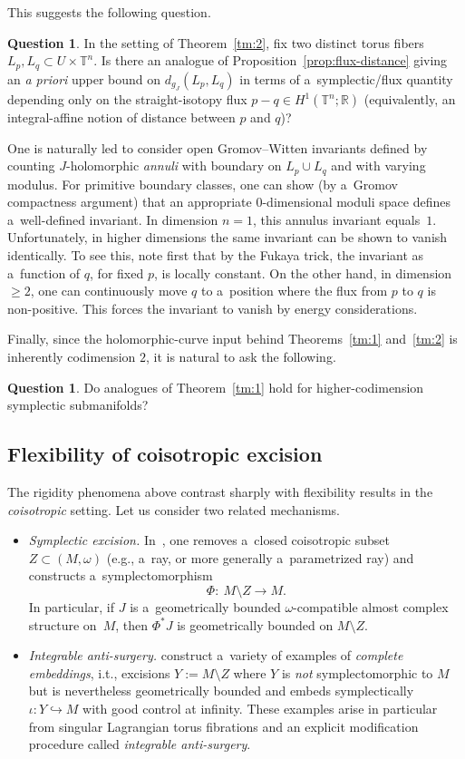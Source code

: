\documentclass[pdftex]{sigma}
\numberwithin{equation}{section}
\newcommand{\bR}{{\mathbb R}}
\newcommand{\bT}{{\mathbb T}}
\theoremstyle{definition}
\newtheorem{ques}[Theorem]{Question}
\begin{document}
This suggests the following question.
\begin{ques}
In the setting of Theorem~\ref{tm:2}, fix two distinct torus fibers $L_p,L_q\subset U\times\bT^n$.
Is there an analogue of Proposition~\ref{prop:flux-distance} giving an \emph{a priori} upper bound on $d_{g_J}(L_p,L_q)$ in terms of a~symplectic/flux quantity depending only on the straight-isotopy flux $p-q\in H^1(\bT^n;\bR)$ (equivalently, an integral-affine notion of distance between $p$ and $q$)?
\end{ques}
One is naturally led to consider open Gromov--Witten invariants defined by counting $J$-holomorphic \emph{annuli} with boundary on $L_p\cup L_q$ and with varying modulus.
For primitive boundary classes, one can show (by a~Gromov compactness argument) that an appropriate $0$-dimensional moduli space defines a~well-defined invariant.
In dimension $n=1$, this annulus invariant equals~$1$.
Unfortunately, in higher dimensions the same invariant can be shown to vanish identically. To see this, note first that by the Fukaya trick, the invariant as a~function of $q$, for fixed $p$, is locally constant. On the other hand, in dimension $\ge 2$, one can continuously move $q$ to a~position where the flux from $p$ to $q$ is non-positive. This forces the invariant to vanish by energy considerations.


Finally, since the holomorphic-curve input behind Theorems~\ref{tm:1} and~\ref{tm:2} is inherently codimension $2$, it is natural to ask the following.
\begin{ques}
Do analogues of Theorem~\ref{tm:1} hold for higher-codimension symplectic submani\-folds?
\end{ques}


\subsection{Flexibility of coisotropic excision}\label{sec:flexibility}
The rigidity phenomena above contrast sharply with flexibility results in the \emph{coisotropic} setting. Let us consider two related mechanisms.
\begin{itemize}
\itemsep=0pt
\item \emph{Symplectic excision.}
In~\cite{KarshonTangExcision,StratmannParamRays}, one removes a~closed coisotropic subset $Z\subset (M,\omega)$ (e.g., a~ray, or more generally a~parametrized ray) and constructs a~symplectomorphism \[
\Phi\colon\ M\setminus Z \longrightarrow M.\]
In particular, if $J$ is a~geometrically bounded $\omega$-compatible almost complex structure on~$M$, then $\Phi^*J$ is geometrically bounded on $M\setminus Z$.

\item \emph{Integrable anti-surgery.}
\cite{GromanVarolgunesCompleteEmbeddings} construct a~variety of examples of \emph{complete embeddings}, i.t., excisions $Y:=M\setminus Z$ where $Y$ is \emph{not} symplectomorphic to $M$ but is nevertheless geometrically bounded and embeds symplectically $\iota\colon Y\hookrightarrow M$ with good control at infinity.
These examples arise in particular from singular Lagrangian torus fibrations and an explicit modification procedure called \emph{integrable anti-surgery}.
\end{itemize}
\end{document}
